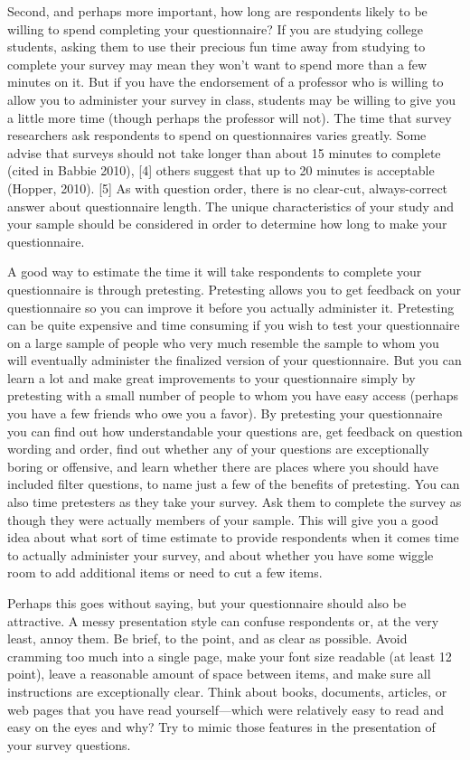 Second, and perhaps more important, how long are respondents likely to be willing to spend completing your questionnaire? If you are studying college students, asking them to use their precious fun time away from studying to complete your survey may mean they won’t want to spend more than a few minutes on it. But if you have the endorsement of a professor who is willing to allow you to administer your survey in class, students may be willing to give you a little more time (though perhaps the professor will not). The time that survey researchers ask respondents to spend on questionnaires varies greatly. Some advise that surveys should not take longer than about 15 minutes to complete (cited in Babbie 2010), [4] others suggest that up to 20 minutes is acceptable (Hopper, 2010). [5] As with question order, there is no clear-cut, always-correct answer about questionnaire length. The unique characteristics of your study and your sample should be considered in order to determine how long to make your questionnaire.

A good way to estimate the time it will take respondents to complete your questionnaire is through pretesting. Pretesting allows you to get feedback on your questionnaire so you can improve it before you actually administer it. Pretesting can be quite expensive and time consuming if you wish to test your questionnaire on a large sample of people who very much resemble the sample to whom you will eventually administer the finalized version of your questionnaire. But you can learn a lot and make great improvements to your questionnaire simply by pretesting with a small number of people to whom you have easy access (perhaps you have a few friends who owe you a favor). By pretesting your questionnaire you can find out how understandable your questions are, get feedback on question wording and order, find out whether any of your questions are exceptionally boring or offensive, and learn whether there are places where you should have included filter questions, to name just a few of the benefits of pretesting. You can also time pretesters as they take your survey. Ask them to complete the survey as though they were actually members of your sample. This will give you a good idea about what sort of time estimate to provide respondents when it comes time to actually administer your survey, and about whether you have some wiggle room to add additional items or need to cut a few items.

Perhaps this goes without saying, but your questionnaire should also be attractive. A messy presentation style can confuse respondents or, at the very least, annoy them. Be brief, to the point, and as clear as possible. Avoid cramming too much into a single page, make your font size readable (at least 12 point), leave a reasonable amount of space between items, and make sure all instructions are exceptionally clear. Think about books, documents, articles, or web pages that you have read yourself—which were relatively easy to read and easy on the eyes and why? Try to mimic those features in the presentation of your survey questions.

